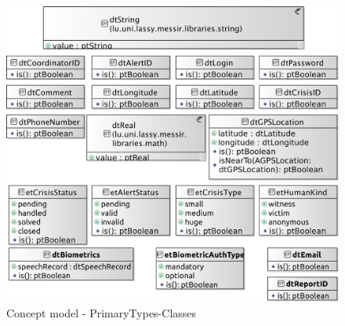 \begin{figure}[H]
\begin{center}
\includegraphics[width=\textwidth]{images/analysis/concept-model/global/PrimaryTypes-Classes/cm-pt-dt-gv-01.eps}
\end{center}
\caption{Concept model - PrimaryTypes-Classes}
\label{fig:conceptDataTypes}
\end{figure}

